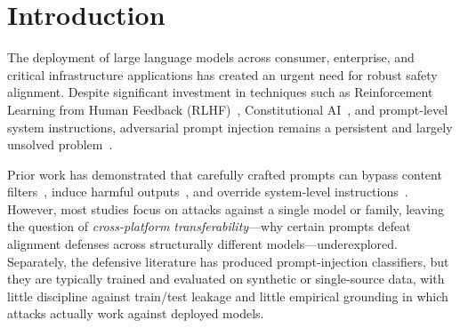 \documentclass{article}
\begin{document}
\begin{abstract}
Our defense---a DeBERTa-v3-large classifier trained on a diverse, leakage-audited corpus---reaches 9-class macro $F_1 = 0.94$ on a held-out benchmark verified disjoint from its training families, at a 0.5\% false-positive rate, ahead of public detectors at their default thresholds. It is \emph{origin-aware}---it ingests a declared provenance tier---and \emph{origin-robust}: it passes benign content at a flat $\sim$1.6\% rate whether that content is declared user input or arrives from any of five untrusted tiers (tool output, retrieved web, memory, tool descriptions, sub-agent output). It can therefore scan untrusted streams without over-blocking---a property a benchmark of user-origin clean rows alone cannot measure. A token ablation and a per-tier probe locate where provenance matters: the deployed MiniLM scanner responds to it---re-scored on identical benign content, its false-positive rate rises with the declared tier (1.6\%~$\to$~2.4\%)---while the larger model is content-driven and essentially invariant to the token (one prediction in 629 changes when it is removed or scrambled). Deployed as live scanning middleware, it drives effective attacks to zero on the confirmed-attack benchmark ($12.4\%\to0\%$ across 10{,}774 paired trials) and $16.3\%\to0\%$ against a live frontier agent (94--98\% blocked at the perimeter). We conclude that effective defense against prompt injection is external to the model, channel-aware, and empirically validated rather than assumed.
\end{abstract}

\section{Introduction}

The deployment of large language models across consumer, enterprise, and critical infrastructure applications has created an urgent need for robust safety alignment. Despite significant investment in techniques such as Reinforcement Learning from Human Feedback (RLHF)~\citep{ouyang2022training}, Constitutional AI~\citep{bai2022constitutional}, and prompt-level system instructions, adversarial prompt injection remains a persistent and largely unsolved problem~\citep{greshake2023not,liu2023prompt}.

Prior work has demonstrated that carefully crafted prompts can bypass content filters~\citep{zou2023universal}, induce harmful outputs~\citep{chao2023jailbreaking}, and override system-level instructions~\citep{greshake2023not}. However, most studies focus on attacks against a single model or family, leaving the question of \emph{cross-platform transferability}---why certain prompts defeat alignment defenses across structurally different models---underexplored. Separately, the defensive literature has produced prompt-injection classifiers, but they are typically trained and evaluated on synthetic or single-source data, with little discipline against train/test leakage and little empirical grounding in which attacks actually work against deployed models.
\end{document}

